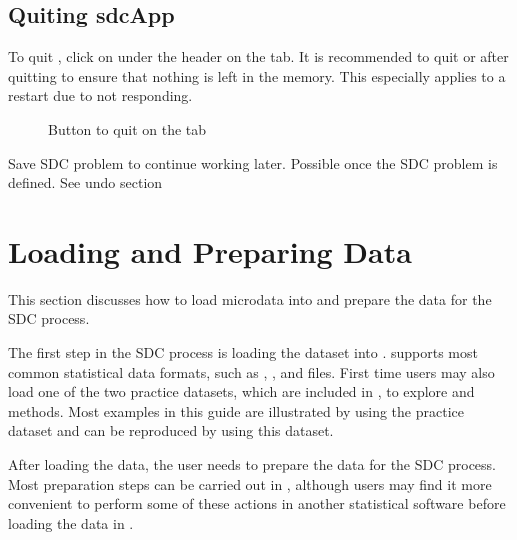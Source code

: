 \documentclass[letterpaper,10pt,english]{sphinxmanual}
\begin{document}
\section{Quiting sdcApp}
\label{\detokenize{introsdcApp:quiting-sdcapp}}
To quit , click on  under the header  on the
 tab. It is recommended to quit  or  after quitting 
to ensure that nothing is left in the memory. This especially applies to a restart due
to  not responding.

\begin{figure}[htbp]
\centering
\capstart

\noindent{}
\caption{Button to quit  on the  tab}\label{\detokenize{introsdcApp:fig35}}\label{\detokenize{introsdcApp:id6}}\end{figure}

Save SDC problem to continue working later. Possible once the SDC problem is defined.
See undo section


\chapter{Loading and Preparing Data}
\label{\detokenize{loadprepdata::doc}}\label{\detokenize{loadprepdata:loading-and-preparing-data}}
This section discusses how to load microdata into  and prepare the data
for the SDC process.

The first step in the SDC process is loading the dataset into .  supports
most common statistical data formats, such as , ,  and  files. First time
users may also load one of the two practice datasets, which are included in ,
to explore  and methods. Most examples in this guide are illustrated by
using the practice dataset  and can be reproduced by using this dataset.

After loading the data, the user needs to prepare the data for the SDC process.
Most preparation steps can be carried out in , although users may find it
more convenient to perform some of these actions in another statistical software
before loading the data in .
\end{document}
